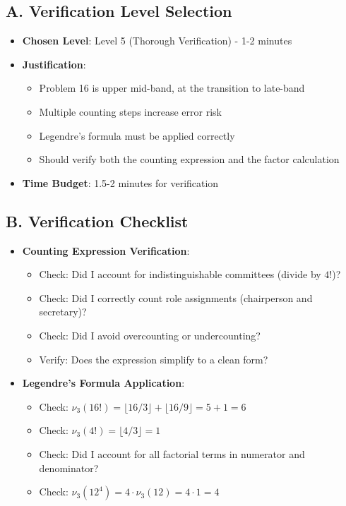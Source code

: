 \documentclass[12pt]{article}
\begin{document}
\begin{verificationbox}
\subsection*{A. Verification Level Selection}
\begin{itemize}[leftmargin=*]
    \item \textbf{Chosen Level}: Level 5 (Thorough Verification) - 1-2 minutes
    
    \item \textbf{Justification}: 
    \begin{itemize}
        \item Problem 16 is upper mid-band, at the transition to late-band
        \item Multiple counting steps increase error risk
        \item Legendre's formula must be applied correctly
        \item Should verify both the counting expression and the factor calculation
    \end{itemize}
    
    \item \textbf{Time Budget}: 1.5-2 minutes for verification
\end{itemize}

\subsection*{B. Verification Checklist}
\begin{itemize}[leftmargin=*]
    \item \textbf{Counting Expression Verification}:
    \begin{itemize}
        \item Check: Did I account for indistinguishable committees (divide by $4!$)?
        \item Check: Did I correctly count role assignments (chairperson and secretary)?
        \item Check: Did I avoid overcounting or undercounting?
        \item Verify: Does the expression simplify to a clean form?
    \end{itemize}
    
    \item \textbf{Legendre's Formula Application}:
    \begin{itemize}
        \item Check: $\nu_3(16!) = \lfloor 16/3 \rfloor + \lfloor 16/9 \rfloor = 5 + 1 = 6$
        \item Check: $\nu_3(4!) = \lfloor 4/3 \rfloor = 1$
        \item Check: Did I account for all factorial terms in numerator and denominator?
        \item Check: $\nu_3(12^4) = 4 \cdot \nu_3(12) = 4 \cdot 1 = 4$
    \end{itemize}
    

\end{itemize}
\end{verificationbox}
\end{document}
